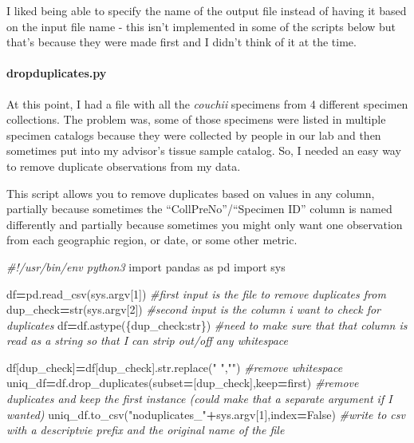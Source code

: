 \documentclass[
]{article}
\newenvironment{Shaded}{\begin{snugshade}}{\end{snugshade}}
\newcommand{\BuiltInTok}[1]{#1}
\newcommand{\CommentTok}[1]{\textcolor[rgb]{0.56,0.35,0.01}{\textit{#1}}}
\newcommand{\DecValTok}[1]{\textcolor[rgb]{0.00,0.00,0.81}{#1}}
\newcommand{\ImportTok}[1]{#1}
\newcommand{\NormalTok}[1]{#1}
\newcommand{\OperatorTok}[1]{\textcolor[rgb]{0.81,0.36,0.00}{\textbf{#1}}}
\newcommand{\StringTok}[1]{\textcolor[rgb]{0.31,0.60,0.02}{#1}}
\newcommand{\VariableTok}[1]{\textcolor[rgb]{0.00,0.00,0.00}{#1}}
\begin{document}
I liked being able to specify the name of the output file instead of
having it based on the input file name - this isn't implemented in some
of the scripts below but that's because they were made first and I
didn't think of it at the time.

\hypertarget{dropduplicates.py}{%
\paragraph{dropduplicates.py}\label{dropduplicates.py}}

At this point, I had a file with all the \emph{couchii} specimens from 4
different specimen collections. The problem was, some of those specimens
were listed in multiple specimen catalogs because they were collected by
people in our lab and then sometimes put into my advisor's tissue sample
catalog. So, I needed an easy way to remove duplicate observations from
my data.

This script allows you to remove duplicates based on values in any
column, partially because sometimes the ``CollPreNo''/``Specimen ID''
column is named differently and partially because sometimes you might
only want one observation from each geographic region, or date, or some
other metric.

\begin{Shaded}
\begin{Highlighting}[]
\CommentTok{\#!/usr/bin/env python3}
\ImportTok{import}\NormalTok{ pandas }\ImportTok{as}\NormalTok{ pd}
\ImportTok{import}\NormalTok{ sys}

\NormalTok{df}\OperatorTok{=}\NormalTok{pd.read\_csv(sys.argv[}\DecValTok{1}\NormalTok{]) }\CommentTok{\#first input is the file to remove duplicates from}
\NormalTok{dup\_check}\OperatorTok{=}\BuiltInTok{str}\NormalTok{(sys.argv[}\DecValTok{2}\NormalTok{]) }\CommentTok{\#second input is the column i want to check for duplicates}
\NormalTok{df}\OperatorTok{=}\NormalTok{df.astype(\{dup\_check:}\BuiltInTok{str}\NormalTok{\}) }\CommentTok{\#need to make sure that that column is read as a string so that I can strip out/off any whitespace}

\NormalTok{df[dup\_check]}\OperatorTok{=}\NormalTok{df[dup\_check].}\BuiltInTok{str}\NormalTok{.replace(}\StringTok{" "}\NormalTok{,}\StringTok{""}\NormalTok{) }\CommentTok{\#remove whitespace}
\NormalTok{uniq\_df}\OperatorTok{=}\NormalTok{df.drop\_duplicates(subset}\OperatorTok{=}\NormalTok{[dup\_check],keep}\OperatorTok{=}\StringTok{\textquotesingle{}first\textquotesingle{}}\NormalTok{) }\CommentTok{\#remove duplicates and keep the first instance (could make that a separate argument if I wanted)}
\NormalTok{uniq\_df.to\_csv(}\StringTok{"noduplicates\_"}\OperatorTok{+}\NormalTok{sys.argv[}\DecValTok{1}\NormalTok{],index}\OperatorTok{=}\VariableTok{False}\NormalTok{) }\CommentTok{\#write to csv with a descriptvie prefix and the original name of the file}
\end{Highlighting}
\end{Shaded}
\end{document}
